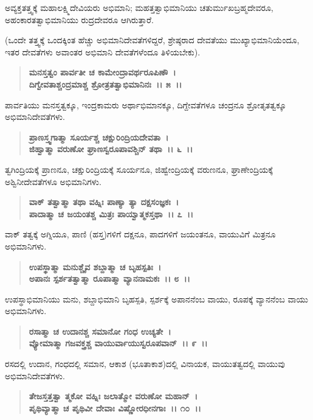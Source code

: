 ಅವ್ಯಕ್ತತತ್ತ್ವಕ್ಕೆ ಮಹಾಲಕ್ಷ್ಮಿದೇವಿಯರು ಅಭಿಮಾನಿ; ಮಹತ್ತತ್ವಾಭಿಮಾನಿಯು ಚತು\-ರ್ಮುಖಬ್ರಹ್ಮದೇವರೂ, ಅಹಂಕಾರತತ್ವಾಭಿಮಾನಿಯು ರುದ್ರದೇವರೂ ಆಗಿರುತ್ತಾರೆ.

(ಒಂದೇ ತತ್ತ್ವಕ್ಕೆ ಒಂದಕ್ಕಿಂತ ಹೆಚ್ಚು ಅಭಿಮಾನಿದೇವತೆಗಳಿದ್ದರೆ, ಶ್ರೇಷ್ಠರಾದ ದೇವತೆಯು ಮುಖ್ಯಾಭಿಮಾನಿಯೆಂದೂ, ಇತರ ದೇವತೆಗಳು ಅವಾಂತರ ಅಭಿಮಾನಿ ದೇವತೆಗಳೆಂದೂ ತಿಳಿಯಬೇಕು).

\begin{verse}
\textbf{ಮನಸ್ತತ್ವಂ ಪಾರ್ವತೀ ಚ ಕಾಮೇಂದ್ರಾವರ್ಥರೂಪಿಣೌ~।}\\\textbf{ದಿಗ್ವೇವತಾಶ್ಚಂದ್ರಮಾಶ್ಚ ಶ್ರೋತ್ರತತ್ವಾಭಿಮಾನಿನಃ~।। ೫~।।}
\end{verse}

ಪಾರ್ವತಿಯು ಮನಸ್ತತ್ವಕ್ಕೂ, ಇಂದ್ರಕಾಮರು ಅರ್ಥಾಭಿಮಾನಕ್ಕೂ, ದಿಗ್ದೇವತೆಗಳೂ ಚಂದ್ರನೂ ಶ್ರೋತೃತತ್ವಕ್ಕೂ ಅಭಿಮಾನಿದೇವತೆಗಳು.

\begin{verse}
\textbf{ಪ್ರಾಣಸ್ತ್ವಗಾತ್ಮಾ ಸೂರ್ಯಶ್ಚ ಚಕ್ಷುರಿಂದ್ರಿಯದೇವತಾ~।}\\\textbf{ಜಿಹ್ವಾತ್ಮಾ ವರುಣೋ ಘ್ರಾಣಸ್ವರೂಪಾವಶ್ಚಿನ್ ತಥಾ~।। ೬~।।}
\end{verse}

ತ್ವಗಿಂದ್ರಿಯಕ್ಕೆ ಪ್ರಾಣನೂ, ಚಕ್ಷುರಿಂದ್ರಿಯಕ್ಕೆ ಸೂರ್ಯನೂ, ಜಿಹ್ವೇಂದ್ರಿಯಕ್ಕೆ ವರುಣನೂ, ಘ್ರಾಣೇಂದ್ರಿಯಕ್ಕೆ ಅಶ್ವಿನೀದೇವತೆಗಳೂ ಅಭಿಮಾನಿಗಳು.

\begin{verse}
\textbf{ವಾಕ್ ತತ್ವಾತ್ಮಾ ತಥಾ ವಹ್ನಿಃ ಪಾಣ್ಯಾ ತ್ಯಾ ದಕ್ಷಸಂಜ್ಞಕಃ~।}\\\textbf{ಪಾದಾತ್ಮಾ ಚ ಜಯಂತಶ್ಚ ಮಿತ್ರಃ ಪಾಯ್ವಾತ್ಮಕಸ್ತಥಾ~।। ೭~।।}
\end{verse}

ವಾಕ್ ತತ್ವಕ್ಕೆ ಅಗ್ನಿಯೂ, ಪಾಣಿ (ಹಸ್ತ)ಗಳಿಗೆ ದಕ್ಷನೂ, ಪಾದಗಳಿಗೆ ಜಯಂತನೂ, ವಾಯುವಿಗೆ ಮಿತ್ರನೂ ಅಭಿಮಾನಿಗಳು.

\begin{verse}
\textbf{ಉಪಸ್ಥಾತ್ಮಾ ಮನುಶ್ಚೈವ ಶಬ್ದಾತ್ಮಾ ಚ ಬೃಹಸ್ಪತಿಃ~।}\\\textbf{ಅಪಾನಃ ಸ್ಪರ್ಶತತ್ವಾತ್ಮಾ ರೂಪಾತ್ಮಾ ವ್ಯಾನನಾಮಕಃ~।। ೮~।।}
\end{verse}

ಉಪಸ್ಥಾಭಿಮಾನಿಯು ಮನು, ಶಬ್ದಾಭಿಮಾನಿ ಬೃಹಸ್ಪತಿ, ಸ್ಪರ್ಶಕ್ಕೆ ಅಪಾನನೆಂಬ ವಾಯು, ರೂಪಕ್ಕೆ ವ್ಯಾನನೆಂಬ ವಾಯು ಅಭಿಮಾನಿಗಳು.

\begin{verse}
\textbf{ರಸಾತ್ಮಾ ಚ ಉದಾನಶ್ಚ ಸಮಾನೋ ಗಂಧ ಉಚ್ಯತೇ~।}\\\textbf{ವ್ಯೋಮಾತ್ಮಾ ಗಜವಕ್ತ್ರಶ್ಚ ವಾಯುರ್ವಾಯುಸ್ವರೂಪವಾನ್~।। ೯~।।}
\end{verse}

ರಸದಲ್ಲಿ ಉದಾನ, ಗಂಧದಲ್ಲಿ ಸಮಾನ, ಆಕಾಶ (ಭೂತಾಕಾಶ)ದಲ್ಲಿ ವಿನಾಯಕ, ವಾಯುತತ್ವದಲ್ಲಿ ವಾಯುವು ಅಭಿಮಾನಿದೇವತೆಗಳು.

\begin{verse}
\textbf{ತೇಜಸ್ತತ್ತತ್ವಾ ತ್ಮಕೋ ವಹ್ನಿಃ ಜಲಾತ್ಮೋ ವರುಣೋ ಮಹಾನ್~।}\\\textbf{ಪೃಥಿವ್ಯಾತ್ಮಾ ಚ ಪೃಥಿವೀ ದೇವಾಃ ವಿಷ್ಣೋರಧೀನಗಾಃ~।। ೧೦~।।}
\end{verse}


